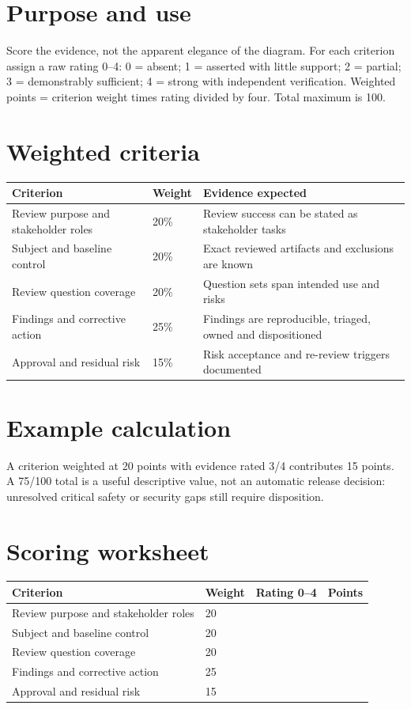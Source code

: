 \documentclass[10pt,letterpaper]{article}
\begin{document}
\DocProvenance
\section{Purpose and use}
Score the evidence, not the apparent elegance of the diagram. For each criterion assign a raw rating 0--4: 0 = absent; 1 = asserted with little support; 2 = partial; 3 = demonstrably sufficient; 4 = strong with independent verification. Weighted points = criterion weight times rating divided by four. Total maximum is 100.

\section{Weighted criteria}
\small
\begin{tabularx}{\linewidth}{@{}YYY@{}}
\toprule
\textbf{Criterion} & \textbf{Weight} & \textbf{Evidence expected} \\
\midrule
Review purpose and stakeholder roles & 20\% & Review success can be stated as stakeholder tasks \\
Subject and baseline control & 20\% & Exact reviewed artifacts and exclusions are known \\
Review question coverage & 20\% & Question sets span intended use and risks \\
Findings and corrective action & 25\% & Findings are reproducible, triaged, owned and dispositioned \\
Approval and residual risk & 15\% & Risk acceptance and re-review triggers documented \\
\bottomrule
\end{tabularx}
\normalsize
\section{Example calculation}
A criterion weighted at 20 points with evidence rated 3/4 contributes 15 points. A 75/100 total is a useful descriptive value, not an automatic release decision: unresolved critical safety or security gaps still require disposition.

\section{Scoring worksheet}
\small
\begin{tabularx}{\linewidth}{@{}YYYY@{}}
\toprule
\textbf{Criterion} & \textbf{Weight} & \textbf{Rating 0--4} & \textbf{Points} \\
\midrule
Review purpose and stakeholder roles & 20 &  &  \\
Subject and baseline control & 20 &  &  \\
Review question coverage & 20 &  &  \\
Findings and corrective action & 25 &  &  \\
Approval and residual risk & 15 &  &  \\
\bottomrule
\end{tabularx}
\normalsize
\end{document}
